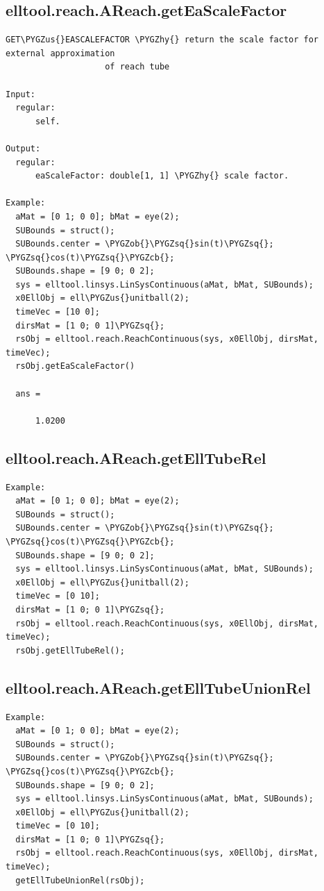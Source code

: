 \documentclass[letterpaper,10pt,english]{sphinxmanual}
\def\PYGZus{\char`\_}
\def\PYGZob{\char`\{}
\def\PYGZcb{\char`\}}
\def\PYGZhy{\char`\-}
\def\PYGZsq{\char`\'}
\begin{document}
\subsection{elltool.reach.AReach.getEaScaleFactor}
\label{chap_functions:elltool-reach-areach-geteascalefactor}
\begin{Verbatim}[commandchars=\\\{\}]
GET\PYGZus{}EASCALEFACTOR \PYGZhy{} return the scale factor for external approximation
                    of reach tube

Input:
  regular:
      self.

Output:
  regular:
      eaScaleFactor: double[1, 1] \PYGZhy{} scale factor.

Example:
  aMat = [0 1; 0 0]; bMat = eye(2);
  SUBounds = struct();
  SUBounds.center = \PYGZob{}\PYGZsq{}sin(t)\PYGZsq{}; \PYGZsq{}cos(t)\PYGZsq{}\PYGZcb{};
  SUBounds.shape = [9 0; 0 2];
  sys = elltool.linsys.LinSysContinuous(aMat, bMat, SUBounds);
  x0EllObj = ell\PYGZus{}unitball(2);
  timeVec = [10 0];
  dirsMat = [1 0; 0 1]\PYGZsq{};
  rsObj = elltool.reach.ReachContinuous(sys, x0EllObj, dirsMat, timeVec);
  rsObj.getEaScaleFactor()

  ans =

      1.0200
\end{Verbatim}


\subsection{elltool.reach.AReach.getEllTubeRel}
\label{chap_functions:elltool-reach-areach-getelltuberel}
\begin{Verbatim}[commandchars=\\\{\}]
Example:
  aMat = [0 1; 0 0]; bMat = eye(2);
  SUBounds = struct();
  SUBounds.center = \PYGZob{}\PYGZsq{}sin(t)\PYGZsq{}; \PYGZsq{}cos(t)\PYGZsq{}\PYGZcb{};
  SUBounds.shape = [9 0; 0 2];
  sys = elltool.linsys.LinSysContinuous(aMat, bMat, SUBounds);
  x0EllObj = ell\PYGZus{}unitball(2);
  timeVec = [0 10];
  dirsMat = [1 0; 0 1]\PYGZsq{};
  rsObj = elltool.reach.ReachContinuous(sys, x0EllObj, dirsMat, timeVec);
  rsObj.getEllTubeRel();
\end{Verbatim}


\subsection{elltool.reach.AReach.getEllTubeUnionRel}
\label{chap_functions:elltool-reach-areach-getelltubeunionrel}
\begin{Verbatim}[commandchars=\\\{\}]
Example:
  aMat = [0 1; 0 0]; bMat = eye(2);
  SUBounds = struct();
  SUBounds.center = \PYGZob{}\PYGZsq{}sin(t)\PYGZsq{}; \PYGZsq{}cos(t)\PYGZsq{}\PYGZcb{};
  SUBounds.shape = [9 0; 0 2];
  sys = elltool.linsys.LinSysContinuous(aMat, bMat, SUBounds);
  x0EllObj = ell\PYGZus{}unitball(2);
  timeVec = [0 10];
  dirsMat = [1 0; 0 1]\PYGZsq{};
  rsObj = elltool.reach.ReachContinuous(sys, x0EllObj, dirsMat, timeVec);
  getEllTubeUnionRel(rsObj);
\end{Verbatim}
\end{document}
